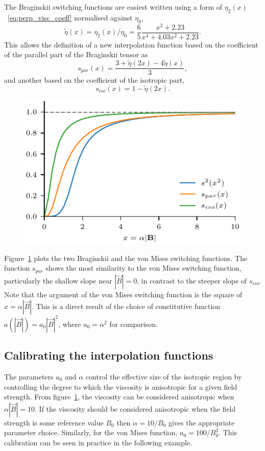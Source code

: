 The Braginskii switching functions are easiest written using a form of $\eta_2(x)$~\eqref{eq:perp_visc_coeff} normalised against $\eta_0$,
\begin{equation}
  \label{eq:eta_function}
  \tilde{\eta}(x) = \eta_2(x)/\eta_0 = \frac{6}{5}\frac{x^2 + 2.23}{x^4 + 4.03x^2 + 2.23}.
\end{equation}
This allows the definition of a new interpolation function based on the coefficient of the parallel part of the Braginskii tensor as
\begin{equation}
  \label{eq:alt_switching1}
s_{par}(x) = \frac{3+\tilde{\eta}(2x)-4\tilde{\eta}(x)}{3},
\end{equation}
and another based on the coefficient of the isotropic part,
\begin{equation}
  \label{eq:alt_switching2}
s_{iso}(x) = 1 - \tilde{\eta}(2x).
\end{equation}

\begin{figure}[t]
  \centering
  \includegraphics[width=0.5\linewidth]{alt_switching.pdf}
  \label{fig:alt_switching}
\end{figure}

Figure~\ref{fig:alt_switching} plots the two Braginskii and the von Mises switching functions. The function $s_{par}$ shows the most similarity to the von Mises switching function, particularly the shallow slope near $|\vec{B}| = 0$, in contrast to the steeper slope of $s_{iso}$. Note that the argument of the von Mises switching function is the square of $x = \alpha |\vec{B}|$. This is a direct result of the choice of constitutive function $a(|\vec{B}|) = a_0 |\vec{B}|^2$, where $a_0 = \alpha^2$ for comparison.

\subsection{Calibrating the interpolation functions}

The parameters $a_0$ and $\alpha$ control the effective size of the isotropic region by controlling the degree to which the viscosity is anisotropic for a given field strength. From figure~\ref{fig:alt_switching}, the viscosity can be considered anisotropic when $\alpha |\vec{B}| = 10$. If the viscosity should be considered anisotropic when the field strength is some reference value $B_0$ then $\alpha = 10/B_0$ gives the appropriate parameter choice. Similarly, for the von Mises function, $a_0 = 100/B_0^2$. This calibration  can be seen in practice in the following example.

